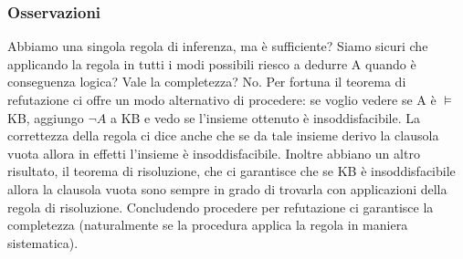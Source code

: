 \documentclass{article}
\begin{document}
\subsubsection{Osservazioni}
Abbiamo una singola regola di inferenza, ma è sufficiente? Siamo sicuri che applicando la regola in tutti i modi possibili riesco a dedurre A quando è conseguenza logica? Vale la completezza? No. 
Per fortuna il teorema di refutazione ci offre un modo alternativo di procedere: se voglio vedere se A è $\models$ KB, aggiungo $\neg A$ a KB e vedo se l’insieme ottenuto è insoddisfacibile. La correttezza della regola ci dice anche che se da tale insieme derivo la clausola vuota allora in effetti l’insieme è insoddisfacibile. Inoltre abbiano un altro risultato, il teorema di risoluzione, che ci garantisce che se KB è insoddisfacibile allora la clausola vuota sono sempre in grado di trovarla con applicazioni della regola di risoluzione. Concludendo procedere per refutazione ci garantisce la completezza (naturalmente se la procedura applica la regola in maniera sistematica).

%
%
\end{document}
